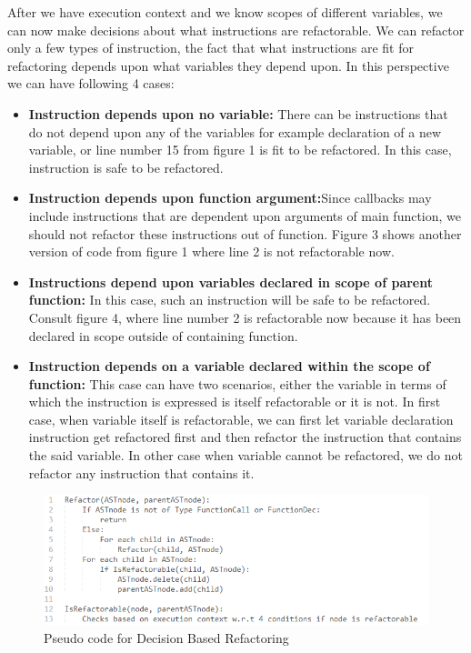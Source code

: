 \documentclass[10pt,conference]{IEEEtran}
\begin{document}
After we have execution context and we know scopes of different variables, we can now make decisions about what instructions are refactorable. We can refactor only a few types of instruction, the fact that what instructions are fit for refactoring depends upon what variables they depend upon. In this perspective we can have following 4 cases:
\begin{itemize}
	\item {\textbf{Instruction depends upon no variable:}
		There can be instructions that do not depend upon any of the variables for example declaration of a new variable, or line number 15 from figure 1 is fit to be refactored. In this case, instruction is safe to be refactored.}
	\item{\textbf{Instruction depends upon function argument:}Since callbacks may include instructions that are dependent upon arguments of main function, we should not refactor these instructions out of function. Figure 3 shows another version of code from figure 1 where line 2 is not refactorable now.}
	\item{\textbf{Instructions depend upon variables declared in scope of parent function:}
		In this case, such an instruction will be safe to be refactored. Consult figure 4, where line number 2 is refactorable now because it has been declared in scope outside of containing function.}
	\item{\textbf{Instruction depends on a variable declared within the scope of function:}
		This case can have two scenarios, either the variable in terms of which the instruction is expressed is itself refactorable or it is not. In first case, when variable itself is refactorable, we can first let variable declaration instruction get refactored first and then refactor the instruction that contains the said variable.
		In other case when variable cannot be refactored, we do not refactor any instruction that contains it.}
\end{itemize}

\begin{figure}[htbp]
	\includegraphics[scale=0.5]{code-decision-refactor.png}
	\caption{Pseudo code for Decision Based Refactoring}
	\label{fig}
\end{figure}
\end{document}
